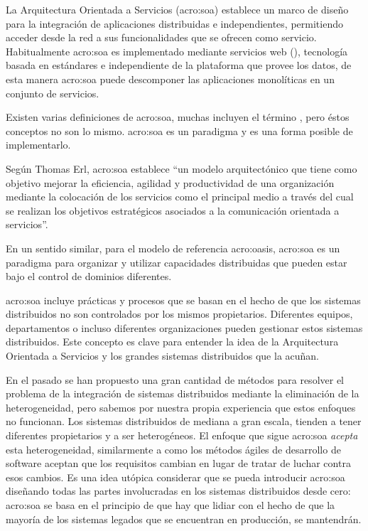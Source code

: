 La Arquitectura Orientada a Servicios (\gls{acro:soa}) establece un marco de diseño para la integración de aplicaciones distribuidas e independientes, permitiendo acceder desde la red a sus funcionalidades que se ofrecen como servicio. Habitualmente \gls{acro:soa} es implementado mediante servicios web (), tecnología basada en estándares e independiente de la plataforma que provee los datos, de esta manera \gls{acro:soa} puede descomponer las aplicaciones monolíticas en un conjunto de servicios\cite{microsoft2006}.

Existen varias definiciones de \gls{acro:soa}, muchas incluyen el término , pero éstos conceptos no son lo mismo. \gls{acro:soa} es un paradigma y  es una forma posible de implementarlo.

Según Thomas Erl\cite{principlesofdesign:erl}, \gls{acro:soa} establece ``un modelo arquitectónico que tiene como objetivo mejorar la eficiencia, agilidad y productividad de una organización mediante la colocación de los servicios como el principal medio a través del cual se realizan los objetivos estratégicos asociados a la comunicación orientada a servicios''.

En un sentido similar, para el modelo de referencia \gls{acro:oasis}, \gls{acro:soa} es un paradigma para organizar y utilizar capacidades distribuidas que pueden estar bajo el control de dominios diferentes.

\gls{acro:soa} incluye prácticas y procesos que se basan en el hecho de que los sistemas distribuidos no son controlados por los mismos propietarios. Diferentes equipos, departamentos o incluso diferentes organizaciones pueden gestionar estos sistemas distribuidos. Este concepto es clave para entender la idea de la Arquitectura Orientada a Servicios y los grandes sistemas distribuidos que la acuñan.

En el pasado se han propuesto una gran cantidad de métodos para resolver el problema de la integración de sistemas distribuidos mediante la eliminación de la heterogeneidad, pero sabemos por nuestra propia experiencia que estos enfoques no funcionan. Los sistemas distribuidos de mediana a gran escala, tienden a tener diferentes propietarios y a ser heterogéneos. El enfoque que sigue \gls{acro:soa} \textit{acepta} esta heterogeneidad, similarmente a como los métodos ágiles de desarrollo de software aceptan que los requisitos cambian en lugar de tratar de luchar contra esos cambios. Es una idea utópica considerar que se pueda introducir \gls{acro:soa} diseñando todas las partes involucradas en los sistemas distribuidos desde cero: \gls{acro:soa} se basa en el principio de que hay que lidiar con el hecho de que la mayoría de los sistemas legados que se encuentran en producción, se mantendrán\cite[p.~15]{josuttis2007}.

